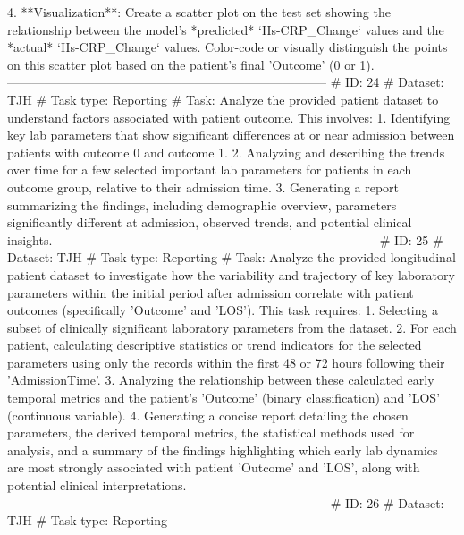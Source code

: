\begin{tcolorbox}[colback=cadmiumgreen!5!white,colframe=forestgreen!75!white,breakable,title=\textit{Generated analytical tasks in task 4.}]
\begin{VerbatimWrap}
 4. **Visualization**: Create a scatter plot on the test set showing the relationship between the model's *predicted* `Hs-CRP_Change` values and the *actual* `Hs-CRP_Change` values. Color-code or visually distinguish the points on this scatter plot based on the patient's final 'Outcome' (0 or 1).
-----------------------------------------------------------------------------
# ID: 24  
# Dataset: TJH 
# Task type: Reporting
# Task: Analyze the provided patient dataset to understand factors associated with patient outcome. This involves: 1. Identifying key lab parameters that show significant differences at or near admission between patients with outcome 0 and outcome 1. 2. Analyzing and describing the trends over time for a few selected important lab parameters for patients in each outcome group, relative to their admission time. 3. Generating a report summarizing the findings, including demographic overview, parameters significantly different at admission, observed trends, and potential clinical insights.
-----------------------------------------------------------------------------
# ID: 25  
# Dataset: TJH 
# Task type: Reporting
# Task: Analyze the provided longitudinal patient dataset to investigate how the variability and trajectory of key laboratory parameters within the initial period after admission correlate with patient outcomes (specifically 'Outcome' and 'LOS'). This task requires: 1. Selecting a subset of clinically significant laboratory parameters from the dataset. 2. For each patient, calculating descriptive statistics or trend indicators for the selected parameters using only the records within the first 48 or 72 hours following their 'AdmissionTime'. 3. Analyzing the relationship between these calculated early temporal metrics and the patient's 'Outcome' (binary classification) and 'LOS' (continuous variable). 4. Generating a concise report detailing the chosen parameters, the derived temporal metrics, the statistical methods used for analysis, and a summary of the findings highlighting which early lab dynamics are most strongly associated with patient 'Outcome' and 'LOS', along with potential clinical interpretations.
-----------------------------------------------------------------------------
# ID: 26  
# Dataset: TJH 
# Task type: Reporting

\end{VerbatimWrap}
\end{tcolorbox}

